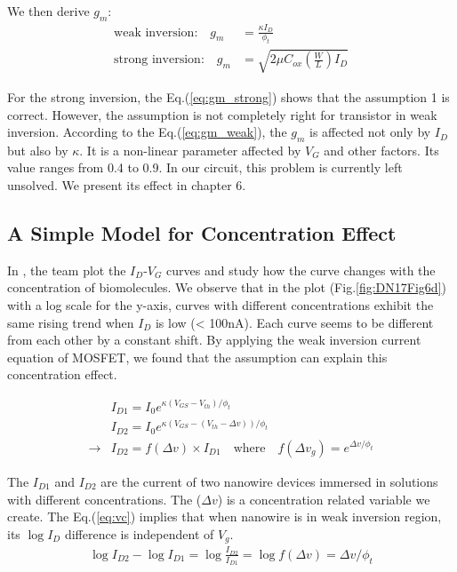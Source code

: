 We then derive $g_m$:
\begin{align}
    \text{weak inversion:} \quad g_m & = \frac{\kappa I_D}{\phi_t} \label{eq:gm_weak} \\
    \text{strong inversion:} \quad g_m & = \sqrt{2 \mu C_{ox} (\frac{W}{L})I_{D}} \label{eq:gm_strong}
\end{align}

For the strong inversion, the Eq.(\ref{eq:gm_strong}) shows that the assumption 1 is correct.
However, the assumption is not completely right for transistor in weak inversion.
According to the Eq.(\ref{eq:gm_weak}), the $g_m$ is affected not only by $I_D$ but also by $\kappa$.
It is a non-linear parameter affected by $V_G$ and other factors.
Its value ranges from 0.4 to 0.9.
In our circuit, this problem is currently left unsolved.
We present its effect in chapter 6.


\subsection{A Simple Model for Concentration Effect}
In \cite{DN17}, the team plot the $I_D$-$V_G$ curves and study how the curve changes with the concentration of biomolecules.
We observe that in the plot (Fig.\ref{fig:DN17Fig6d}) with a log scale for the y-axis, curves with different concentrations exhibit the same rising trend when $I_D$ is low (< 100nA).
Each curve seems to be different from each other by a constant shift.
By applying the weak inversion current equation of MOSFET, we found that the assumption can explain this concentration effect.

\begin{align}
    & I_{D1} = I_{0} e^{\kappa(V_{GS} - V_{th}) / \phi_t} \\
    & I_{D2} = I_{0} e^{\kappa(V_{GS} - (V_{th} - \Delta v)) / \phi_t} \\
    \rightarrow & I_{D2} = f(\Delta v) \times I_{D1} \quad \text{where} \quad f(\Delta v_g) = e^{\Delta v / \phi_t} \label{eq:vc}
\end{align}

The $I_{D1}$ and $I_{D2}$ are the current of two nanowire devices immersed in solutions with different concentrations.
The ($\Delta v$) is a concentration related variable we create.
The Eq.(\ref{eq:vc}) implies that when nanowire is in weak inversion region, its $\log I_D$ difference is independent of $V_g$.
\begin{align}
    \log I_{D2} - \log I_{D1} = \log \frac{I_{D2}}{I_{D1}} = \log f(\Delta v) = \Delta v / \phi_t
\end{align}

